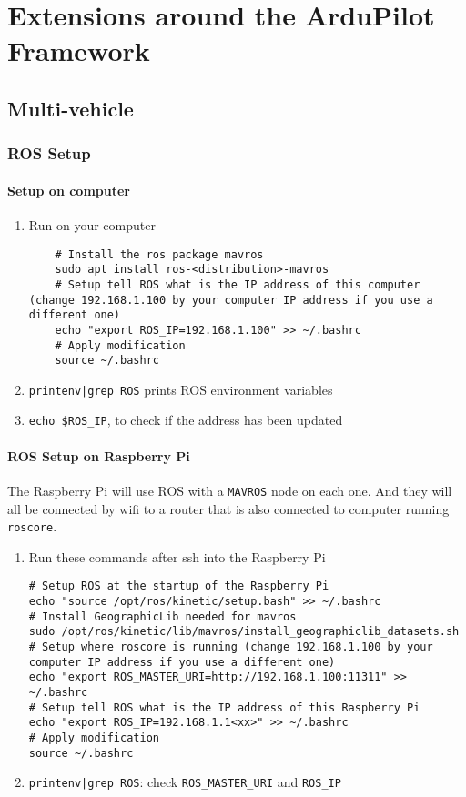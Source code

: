 \chapter{Extensions around the ArduPilot Framework}

\section{Multi-vehicle}

\subsection{ROS Setup}
\subsubsection{Setup on computer}
\begin{enumerate}
    \item Run on your computer

          \begin{verbatim}
    # Install the ros package mavros
    sudo apt install ros-<distribution>-mavros
    # Setup tell ROS what is the IP address of this computer (change 192.168.1.100 by your computer IP address if you use a different one)
    echo "export ROS_IP=192.168.1.100" >> ~/.bashrc
    # Apply modification
    source ~/.bashrc
                    \end{verbatim}
    \item \texttt{printenv|grep ROS} prints ROS environment variables
    \item \texttt{echo \$ROS\_IP}, to check if the address has been updated
\end{enumerate}

\subsubsection{ROS Setup on Raspberry Pi}

The Raspberry Pi will use ROS with a \texttt{MAVROS} node on each one. And they will all be connected by wifi to a router that is also connected to computer running \texttt{roscore}.
\begin{enumerate}
    \item Run these commands after ssh into the Raspberry Pi

          \begin{verbatim}
# Setup ROS at the startup of the Raspberry Pi
echo "source /opt/ros/kinetic/setup.bash" >> ~/.bashrc
# Install GeographicLib needed for mavros
sudo /opt/ros/kinetic/lib/mavros/install_geographiclib_datasets.sh
# Setup where roscore is running (change 192.168.1.100 by your computer IP address if you use a different one)
echo "export ROS_MASTER_URI=http://192.168.1.100:11311" >> ~/.bashrc
# Setup tell ROS what is the IP address of this Raspberry Pi
echo "export ROS_IP=192.168.1.1<xx>" >> ~/.bashrc
# Apply modification
source ~/.bashrc
                    \end{verbatim}
    \item \texttt{printenv|grep ROS}: check \texttt{ROS\_MASTER\_URI} and \texttt{ROS\_IP}
\end{enumerate}

